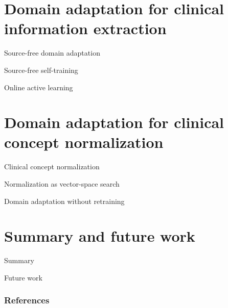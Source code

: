 \documentclass[14pt]{beamer}
\begin{document}
\section{Domain adaptation for clinical information extraction}

\begin{frame}{Source-free domain adaptation}
\end{frame}

\begin{frame}{Source-free self-training}
\end{frame}

\begin{frame}{Online active learning}
\end{frame}

\section{Domain adaptation for clinical concept normalization}

\begin{frame}{Clinical concept normalization}
\end{frame}

\begin{frame}{Normalization as vector-space search}
\end{frame}

\begin{frame}{Domain adaptation without retraining}
\end{frame}

\section*{Summary and future work}

\begin{frame}{Summary}
\end{frame}

\begin{frame}{Future work}
\end{frame}

\appendix

\begin{frame}[allowframebreaks]
        \frametitle{References}
        
        
\end{frame}
\end{document}
